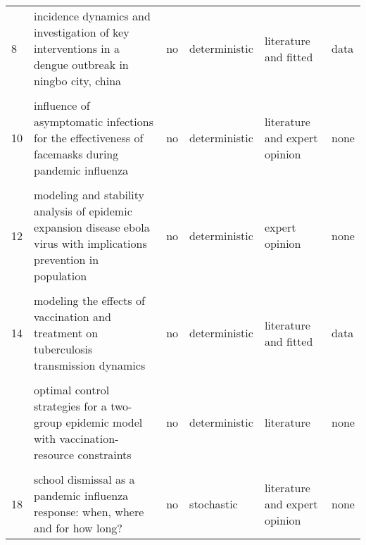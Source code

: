 \documentclass[
]{article}
\begin{document}
\begin{landscape}
\begin{longtable}{l>{\raggedright\arraybackslash}p{3cm}l>{\raggedright\arraybackslash}p{3cm}ll}
8 & incidence dynamics and investigation of key interventions in a dengue outbreak in ningbo city, china & no & deterministic & literature and fitted & data\\
\cellcolor{gray!6}{9} & \cellcolor{gray!6}{incorporating media data into a model of infectious disease transmission} & \cellcolor{gray!6}{no} & \cellcolor{gray!6}{stochastic} & \cellcolor{gray!6}{literature and fitted} & \cellcolor{gray!6}{data}\\
10 & influence of asymptomatic infections for the effectiveness of facemasks during pandemic influenza & no & deterministic & literature and expert opinion & none\\
\addlinespace
\cellcolor{gray!6}{11} & \cellcolor{gray!6}{mathematical analysis of a cholera infection model with vaccination strategy} & \cellcolor{gray!6}{no} & \cellcolor{gray!6}{deterministic} & \cellcolor{gray!6}{literature and expert opinion} & \cellcolor{gray!6}{none}\\
12 & modeling and stability analysis of epidemic expansion disease ebola virus with implications prevention in population & no & deterministic & expert opinion & none\\
\cellcolor{gray!6}{13} & \cellcolor{gray!6}{modeling the effectiveness of respiratory protective devices in reducing influenza outbreak} & \cellcolor{gray!6}{no} & \cellcolor{gray!6}{deterministic} & \cellcolor{gray!6}{literature and expert opinion} & \cellcolor{gray!6}{none}\\
14 & modeling the effects of vaccination and treatment on tuberculosis transmission dynamics & no & deterministic & literature and fitted & data\\
\cellcolor{gray!6}{15} & \cellcolor{gray!6}{optimal control and cost-effective analysis of the 2017 meningitis outbreak in nigeria} & \cellcolor{gray!6}{no} & \cellcolor{gray!6}{deterministic} & \cellcolor{gray!6}{literature and expert opinion and fitted} & \cellcolor{gray!6}{none}\\
\addlinespace
16 & optimal control strategies for a two-group epidemic model with vaccination-resource constraints & no & deterministic & literature & none\\
\cellcolor{gray!6}{17} & \cellcolor{gray!6}{optimal media reporting intensity on mitigating spread of an emerging infectious disease} & \cellcolor{gray!6}{no} & \cellcolor{gray!6}{deterministic} & \cellcolor{gray!6}{literature and fitted} & \cellcolor{gray!6}{none}\\
18 & school dismissal as a pandemic influenza response: when, where and for how long? & no & stochastic & literature and expert opinion & none\\

\end{longtable}
\end{landscape}
\end{document}
